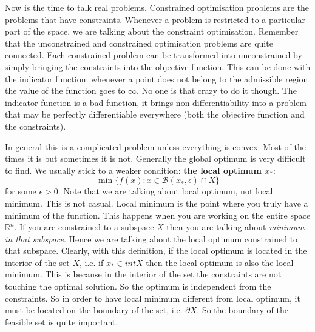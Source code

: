 \par Now is the time to talk real problems. Constrained optimisation problems are the problems that have constraints. Whenever a problem is restricted to a particular part of the space, we are talking about the constraint optimisation. Remember that the unconstrained and constrained optimisation problems are quite connected. Each constrained problem can be transformed into unconstrained by simply bringing the constraints into the objective function. This can be done with the indicator function: whenever a point does not belong to the admissible region the value of the function goes to $\infty$. No one is that crazy to do it though. The indicator function is a bad function, it brings non differentiability into a problem that may be perfectly differentiable everywhere (both the objective function and the constraints).
\par In general this is a complicated problem unless everything is convex. Most of the times it is but sometimes it is not. Generally the global optimum is very difficult to find. We usually stick to a weaker condition: \textbf{the local optimum $x_*$}:
\begin{equation}
    \min\{f(x) : x \in \mathcal{B}(x_*,\epsilon) \cap X\}
\end{equation}
for some $\epsilon > 0$. Note that we are talking about local optimum, not local minimum. This is not casual. Local minimum is the point where you truly have a minimum of the function. This happens when you are working on the entire space $\mathbb{R}^n$. If you are constrained to a subspace $X$ then you are talking about \textit{minimum in that subspace}. Hence we are talking about the local optimum constrained to that subspace. Clearly, with this definition, if the local optimum is located in the interior of the set $X$, i.e. if $x_* \in \textit{int} X$ then the local optimum is also the local minimum. This is because in the interior of the set the constraints are not touching the optimal solution. So the optimum is independent from the constraints. So in order to have local minimum different from local optimum, it must be located on the boundary of the set, i.e. $\partial X$. So the boundary of the feasible set is quite important.
%
